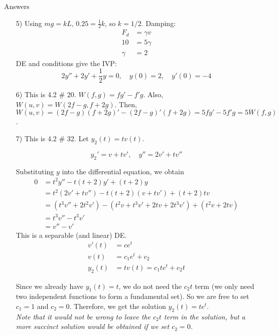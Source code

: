 \documentclass[12pt]{exam}
\begin{document}
\newpage

\large{Answers}

\begin{enumerate}

\item[5)] Using $mg = kL$, $0.25 = \frac 12 k$, so $k = 1/2$. Damping: \begin{align*}F_d &= \gamma v \\ 10&=5 \gamma  \\
\gamma &= 2\end{align*}
DE and conditions give the IVP: 
$$2y'' +2y' + \frac 12 y = 0, \quad y(0) = 2, \quad y'(0) = -4$$ 
\item[6)] This is 4.2 \# 20. $W(f,g) = fg' - f'g$. Also, $W(u,v) = W(2f - g,f + 2g) $. Then, $W(u,v) =(2f-g)(f+2g)'
 - (2f- g)'(f+2g)= 5fg' - 5f'g = 5W(f,g)$. 

\item[7)] This is 4.2 \# 32. Let $y_2(t) = tv(t)$. 

$$y_2' = v + tv', \quad y'' = 2v' + tv''$$

Substituting $y$ into the differential equation, we obtain 
\begin{align*}
    0 &= t^2y'' - t(t+2)y' + (t+2)y \\
    &= t^2(2v' + tv'') - t(t+2)(v + tv') + (t+2)tv \\
    &= (t^3v'' +2t^2v') - ( t^2v + t^3v' + 2tv + 2t^3v') + (t^2v+2tv) \\
    &= t^3v'' - t^3 v' \\
    &= v'' - v'
\end{align*}
This is a separable (and linear) DE. 
\begin{align*}
    v'(t) &= ce^t \\
    v(t) &= c_1 e^t + c_2 \\
    y_2(t) &= tv(t) = c_1te^t + c_2t
\end{align*}

Since we already have $y_1(t) = t$, we do not need the $c_2t$ term (we only need two independent functions to form a fundamental set). So we are free to set $c_1 = 1$ and $c_2 = 0$. Therefore, we get the solution $y_2(t) = te^t$. \\[12pt] \textit{Note that it would not be wrong to leave the $c_2t$ term in the solution, but a more succinct solution would be obtained if we set $c_2 = 0$. }
\end{enumerate} 
\end{document}
